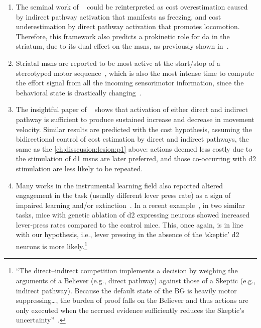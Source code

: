 \begin{enumerate}[noitemsep, label=\Roman*.]
    \item \label{ch:disscusion:lesion:p1} The seminal work of \citeauthor{Kravitz2010Nature}~\cite{Kravitz2010Nature} could be reinterpreted as cost overestimation caused by indirect pathway activation that manifests as freezing, and cost underestimation by direct pathway activation that promotes locomotion.
    Therefore, this framework also predicts a prokinetic role for \gls{da} in the striatum, due to its dual effect on the \glspl{msn}, as previously shown in~\cite{Howe2016N}.
    \item Striatal \glspl{msn} are reported to be most active at the start/stop of a stereotyped motor sequence~\cite{Barnes2005Nature, Jin2014NN}, which is also the most intense time to compute the effort signal from all the incoming sensorimotor information, since the behavioral state is drastically changing~\cite{Sales-Carbonell2018, Robbe2018}.
    \item The insightful paper of ~\cite{Yttri2016Nature} shows that activation of either direct and indirect pathway is sufficient to produce sustained increase and decrease in movement velocity.
    Similar results are predicted with the cost hypothesis, assuming the bidirectional control of cost estimation by direct and indirect pathways, the same as the \autoref{ch:disscusion:lesion:p1} above:
    actions deemed less costly due to the stimulation of \gls{d1} \glspl{msn} are later preferred, and those co-occurring with \gls{d2} stimulation are less likely to be repeated.
    \item Many works in the instrumental learning field also reported altered engagement in the task (usually different lever press rate) as a sign of impaired learning and/or extinction~\cite[see][as an example]{Hart2018CurrBiol}.
    In a recent example~\cite{Matamales2020Sci}, in two similar tasks, mice with genetic ablation of \gls{d2} expressing neurons showed increased lever-press rates compared to the control mice.
    This, once again, is in line with our hypothesis, i.e., lever pressing in the absence of the `skeptic' \gls{d2} neurons is more likely.\footnote{
        ``The direct–indirect competition implements a decision by weighing the arguments of a Believer (e.g., direct pathway) against those of a Skeptic (e.g., indirect pathway).
        Because the default state of the BG is heavily motor suppressing\ldots, the burden of proof falls on the Believer and thus actions are only executed when the accrued evidence sufficiently reduces the Skeptic’s uncertainty''~\cite{Dunovan2016FrontNeurosci}.
    }
\end{enumerate}
